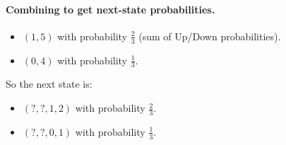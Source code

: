 \begin{enumerate}
    \paragraph{Combining to get next-state probabilities.}
    \begin{itemize}
      \item \((1,5)\) with probability \(\frac{2}{3}\) (sum of Up/Down probabilities).
      \item \((0,4)\) with probability \(\frac{1}{3}\).
    \end{itemize}

    So the next state is:
    \begin{itemize}
      \item \((?,?,1,2)\) with probability \(\frac{2}{3}\).
      \item \((?,?,0,1)\) with probability \(\frac{1}{3}\).
    \end{itemize}

\end{enumerate}

